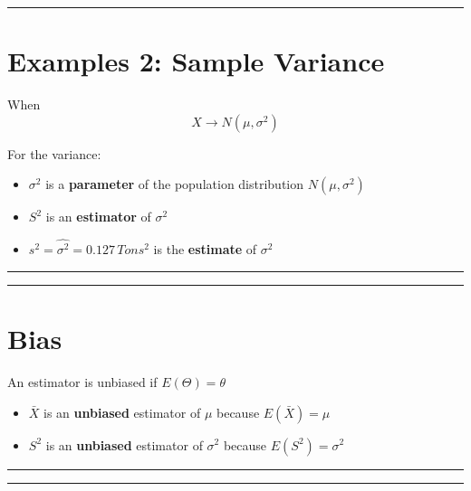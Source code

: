 \documentclass[
]{book}
\providecommand{\tightlist}{%
  \setlength{\itemsep}{0pt}\setlength{\parskip}{0pt}}
\begin{document}
\begin{center}\rule{0.5\linewidth}{0.5pt}\end{center}

\hypertarget{examples-2-sample-variance}{%
\section{Examples 2: Sample Variance}\label{examples-2-sample-variance}}

When \[X \rightarrow N(\mu, \sigma^2)\]

For the variance:

\begin{itemize}
\tightlist
\item
  \(\sigma^2\) is a \textbf{parameter} of the population distribution \(N(\mu, \sigma^2)\)
\item
  \(S^2\) is an \textbf{estimator} of \(\sigma^2\)
\item
  \(s^2=\hat{\sigma^2}=0.127 \, Tons^2\) is the \textbf{estimate} of \(\sigma^2\)
\end{itemize}

\begin{center}\rule{0.5\linewidth}{0.5pt}\end{center}

\begin{center}\rule{0.5\linewidth}{0.5pt}\end{center}

\hypertarget{bias}{%
\section{Bias}\label{bias}}

An estimator is unbiased if \(E(\Theta)=\theta\)

\begin{itemize}
\item
  \(\bar{X}\) is an \textbf{unbiased} estimator of \(\mu\) because \(E(\bar{X})=\mu\)
\item
  \(S^2\) is an \textbf{unbiased} estimator of \(\sigma^2\) because \(E(S^2)=\sigma^2\)
\end{itemize}

\begin{center}\rule{0.5\linewidth}{0.5pt}\end{center}

\begin{center}\rule{0.5\linewidth}{0.5pt}\end{center}
\end{document}
